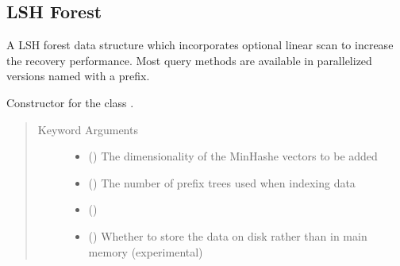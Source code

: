 \documentclass[letterpaper,10pt,english]{sphinxmanual}
\begin{document}
\subsection{LSH Forest}
\label{\detokenize{documentation:lsh-forest}}\label{\detokenize{documentation:lshforest-doc}}

\begin{fulllineitems}
\label{\detokenize{documentation:tmap.LSHForest}}
A LSH forest data structure which incorporates optional linear scan to increase the recovery performance. Most query methods are available in parallelized versions named with a  prefix.

Constructor for the class {\hyperref[\detokenize{documentation:tmap.LSHForest}]{}}.
\begin{quote}\begin{description}
\item[{Keyword Arguments}] \leavevmode\begin{itemize}
\item {} 
 () \textendash{} The dimensionality of the MinHashe vectors to be added

\item {} 
 () \textendash{} The number of prefix trees used when indexing data

\item {} 
 () \textendash{} 

\item {} 
 () Whether to store the data on disk rather than in main memory (experimental) \textendash{} 

\end{itemize}

\end{description}\end{quote}


\end{fulllineitems}
\end{document}
